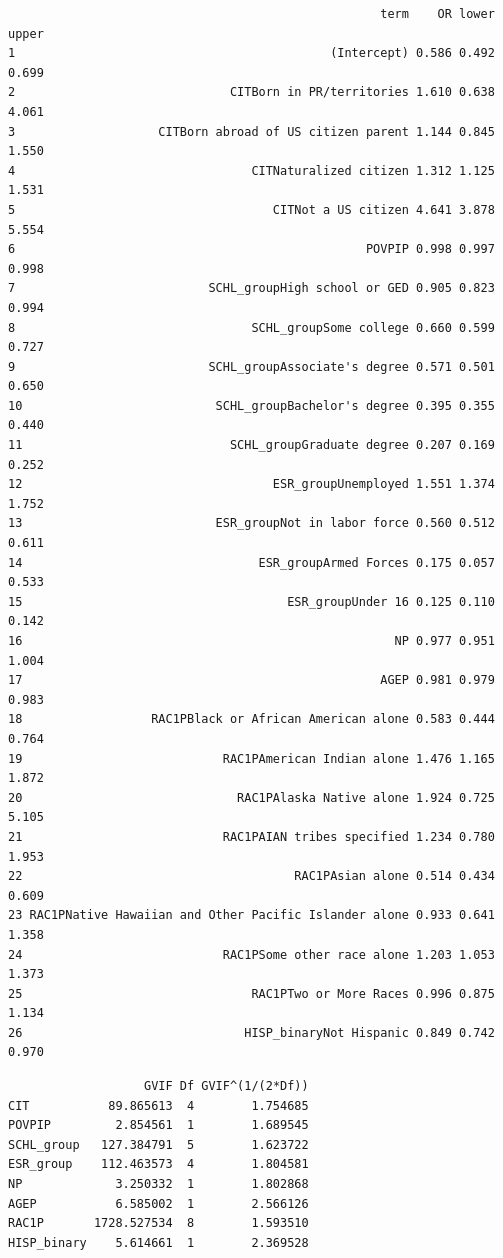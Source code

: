 \documentclass[
  letterpaper,
  DIV=11,
  numbers=noendperiod]{scrartcl}
\begin{document}
\begin{verbatim}
                                                    term    OR lower upper
1                                            (Intercept) 0.586 0.492 0.699
2                              CITBorn in PR/territories 1.610 0.638 4.061
3                    CITBorn abroad of US citizen parent 1.144 0.845 1.550
4                                 CITNaturalized citizen 1.312 1.125 1.531
5                                    CITNot a US citizen 4.641 3.878 5.554
6                                                 POVPIP 0.998 0.997 0.998
7                           SCHL_groupHigh school or GED 0.905 0.823 0.994
8                                 SCHL_groupSome college 0.660 0.599 0.727
9                           SCHL_groupAssociate's degree 0.571 0.501 0.650
10                           SCHL_groupBachelor's degree 0.395 0.355 0.440
11                             SCHL_groupGraduate degree 0.207 0.169 0.252
12                                   ESR_groupUnemployed 1.551 1.374 1.752
13                           ESR_groupNot in labor force 0.560 0.512 0.611
14                                 ESR_groupArmed Forces 0.175 0.057 0.533
15                                     ESR_groupUnder 16 0.125 0.110 0.142
16                                                    NP 0.977 0.951 1.004
17                                                  AGEP 0.981 0.979 0.983
18                  RAC1PBlack or African American alone 0.583 0.444 0.764
19                            RAC1PAmerican Indian alone 1.476 1.165 1.872
20                              RAC1PAlaska Native alone 1.924 0.725 5.105
21                            RAC1PAIAN tribes specified 1.234 0.780 1.953
22                                      RAC1PAsian alone 0.514 0.434 0.609
23 RAC1PNative Hawaiian and Other Pacific Islander alone 0.933 0.641 1.358
24                            RAC1PSome other race alone 1.203 1.053 1.373
25                                RAC1PTwo or More Races 0.996 0.875 1.134
26                               HISP_binaryNot Hispanic 0.849 0.742 0.970
\end{verbatim}

\begin{verbatim}
                   GVIF Df GVIF^(1/(2*Df))
CIT           89.865613  4        1.754685
POVPIP         2.854561  1        1.689545
SCHL_group   127.384791  5        1.623722
ESR_group    112.463573  4        1.804581
NP             3.250332  1        1.802868
AGEP           6.585002  1        2.566126
RAC1P       1728.527534  8        1.593510
HISP_binary    5.614661  1        2.369528
\end{verbatim}
\end{document}
